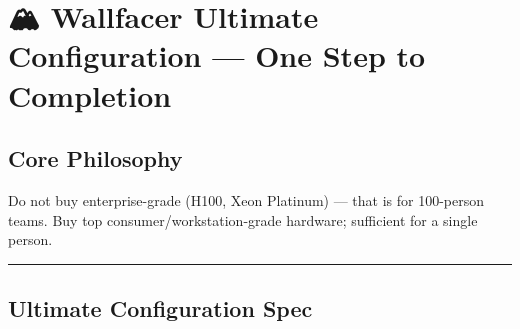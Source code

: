 \documentclass[
  12pt,
]{article}
\author{SCX}
\date{2026}
\begin{document}
\section{🏔️ Wallfacer Ultimate Configuration --- One Step to Completion}\label{wallfacer-ultimate-configuration-one-step-to-completion}

\subsection{Core Philosophy}\label{core-philosophy}

Do not buy enterprise-grade (H100, Xeon Platinum) --- that is for 100-person teams. Buy top consumer/workstation-grade hardware; sufficient for a single person.

\begin{center}\rule{0.5\linewidth}{0.5pt}\end{center}

\subsection{Ultimate Configuration Spec}\label{ultimate-configuration-spec}
\end{document}
